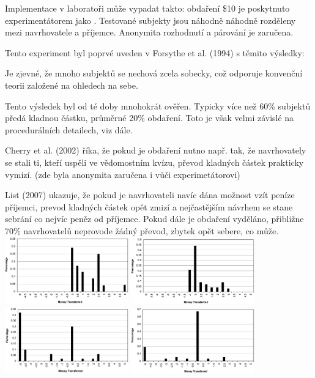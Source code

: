 \documentclass[a5paper,12pt]{article}
\begin{document}
      Implementace v laboratoři může vypadat takto: obdaření \$10 je poskytnuto experimentátorem jako
      . Testované subjekty jsou náhodně náhodně rozděleny mezi navrhovatele a příjemce.
      Anonymita rozhodnutí a párování je zaručena.
        
      Tento experiment byl poprvé uveden v Forsythe et al. (1994) s těmito výsledky:
      \begin{compactitem}
        \item
          Je zjevné, že mnoho subjektů se nechová zcela sobecky, což odporuje konvenční teorii založené na
          ohledech na sebe.
        \item
          Tento výsledek byl od té doby mnohokrát ověřen. Typicky více než 60\% subjektů předá kladnou částku,
          průměrné 20\% obdaření. Toto je však velmi závislé na procedurálních detailech, viz dále.
      \end{compactitem}
      Cherry et al. (2002) říka, že pokud je obdaření nutno  např. tak, že navrhovately se stali ti,
      kteří uspěli ve vědomostním kvízu, převod kladných částek prakticky vymizí. (zde byla anonymita zaručena i
      vůči experimetátorovi)
      
      List (2007) ukazuje, že pokud je navrhovateli navíc dána možnost vzít peníze příjemci, prevod kladných částek
      opět zmizí a nejčastějším návrhem se stane sebrání co nejvíc peněz od příjemce. Pokud dále je obdaření vyděláno,
      přibližne 70\% navrhovatelů neprovode žádný převod, zbytek opět sebere, co může.\\
      \includegraphics[width=0.4\textwidth]{list1.png}
      \includegraphics[width=0.4\textwidth]{list2.png}\\
      \includegraphics[width=0.4\textwidth]{list3.png}
      \includegraphics[width=0.4\textwidth]{list4.png}\\
\end{document}
